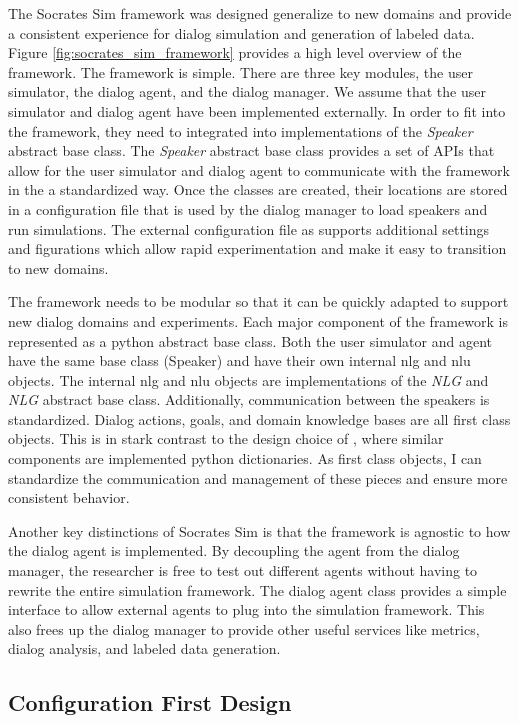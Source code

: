 The Socrates Sim framework was designed generalize to new domains and provide a consistent experience for dialog simulation and generation of labeled data. Figure \ref{fig:socrates_sim_framework} provides a high level overview of the framework. The framework is simple. There are three key modules, the user simulator, the dialog agent, and the dialog manager. We assume that the user simulator and dialog agent have been implemented externally. In order to fit into the framework, they need to integrated into implementations of the \textit{Speaker} abstract base class. The \textit{Speaker} abstract base class provides a set of APIs that allow for the user simulator and dialog agent to communicate with the framework in the a standardized way. Once the classes are created, their locations are stored in a configuration file that is used by the dialog manager to load speakers and run simulations. The external configuration file as supports additional settings and figurations which allow rapid experimentation and make it easy to transition to new domains.

The framework needs to be modular so that it can be quickly adapted to support new dialog domains and experiments. Each major component of the framework is represented as a python abstract base class. Both the user simulator and agent have the same base class (Speaker) and have their own internal nlg and nlu objects. The internal nlg and nlu objects are implementations of the \textit{NLG} and \textit{NLG} abstract base class. Additionally, communication between the speakers is standardized. Dialog actions, goals, and domain knowledge bases are all first class objects. This is in stark contrast to the design choice of \cite{li_end_to_end}, where similar components are implemented python dictionaries. As first class objects, I can standardize the communication and management of these pieces and ensure more consistent behavior.

Another key distinctions of Socrates Sim is that the framework is agnostic to how the dialog agent is implemented. By decoupling the agent from the dialog manager, the researcher is free to test out different agents without having to rewrite the entire simulation framework.  The dialog agent class provides a simple interface to allow external agents to plug into the simulation framework. This also frees up the dialog manager to provide other useful services like metrics, dialog analysis, and labeled data generation.

\subsection{Configuration First Design} 

